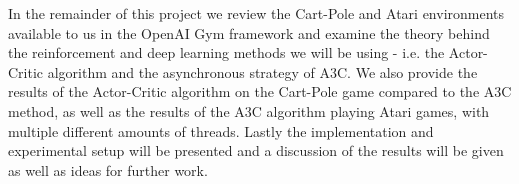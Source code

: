 \documentclass[11pt]{article}
\begin{document}
In the remainder of this project we review the 
Cart-Pole and Atari environments available to us in
the OpenAI Gym framework and examine the theory behind the
reinforcement and deep learning methods we will be using
- i.e. the Actor-Critic algorithm and the asynchronous strategy of A3C.
We also provide the results of the Actor-Critic algorithm
on the Cart-Pole game compared to the A3C method, as well as the
results of the A3C algorithm playing Atari games, with multiple different 
amounts of threads. 
Lastly the implementation and experimental setup will be presented and
a discussion of the results will be given as well as ideas for further
work.






%
%
\end{document}
